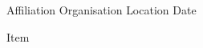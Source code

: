 

\begin{cventries}

  \cventry
  {Affiliation} %
  {Organisation} %
  {Location} %
  {Date} %
  {
    \begin{cvitems} %
      \item {Item}
    \end{cvitems}
  }

\end{cventries}
